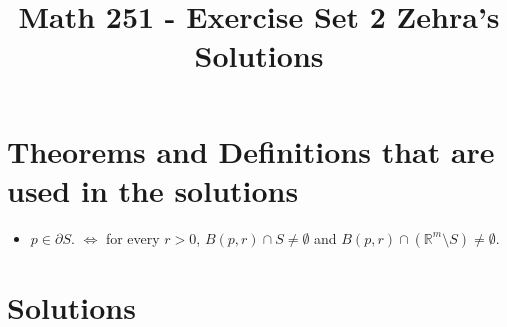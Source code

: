 \documentclass{article}
\title{Math 251 - Exercise Set 2 Zehra's Solutions}
\begin{document}
\maketitle
\section{Theorems and Definitions that are used in the solutions} 
\begin{itemize}
    \item  $p \in \partial S$. $\iff$ for every $r > 0$, $B(p,r) \cap S \neq \emptyset$ and $B(p,r) \cap (\mathbb{R}^m \setminus S) \neq \emptyset$. \\

\end{itemize}

\section{Solutions}
\end{document}
